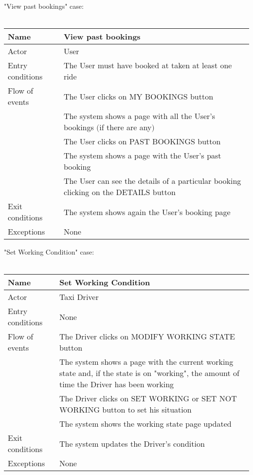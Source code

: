 \newpage
"View past bookings" case:
\\
\\
\begin{tabular}{|l|p{10cm}|} 
\hline
Name & View past bookings\\
\hline
Actor & User\\
\hline
Entry conditions & The User must have booked at taken at least one ride\\
\hline
Flow of events
			&	\tabitem The User clicks on MY BOOKINGS button\\
			&	\tabitem The system shows a page with all the User's bookings $($if there are any$)$\\
			&	\tabitem The User clicks on PAST BOOKINGS button\\
			&	\tabitem The system shows a page with the User's past booking\\
			&	\tabitem The User can see the details of a particular booking clicking on the DETAILS button\\
	
\hline
Exit conditions & The system shows again the User's booking page\\
\hline
Exceptions & None\\
\hline
\end {tabular}

\newpage
"Set Working Condition" case:
\\
\\
\begin{tabular}{|l|p{10cm}|} 
\hline
Name & Set Working Condition\\
\hline
Actor & Taxi Driver\\
\hline
Entry conditions & None\\
\hline
Flow of events
			&	\tabitem The Driver clicks on MODIFY WORKING STATE button\\
			&	\tabitem The system shows a page with the current working state and, if the state is on "working", the amount of time the Driver has been working\\
			&	\tabitem The Driver clicks on SET WORKING or SET NOT WORKING button to set his situation\\
			&	\tabitem The system shows the working state page updated\\

	
\hline
Exit conditions & The system updates the Driver's condition\\
\hline
Exceptions & None\\
\hline
\end {tabular}


